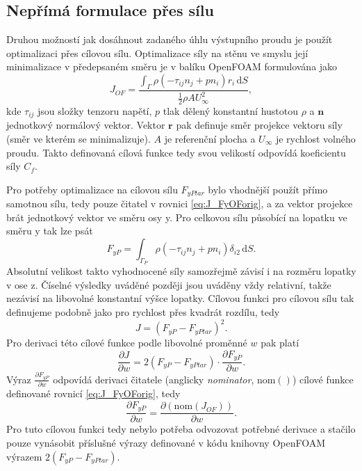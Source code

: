 \subsection{Nepřímá formulace přes sílu}

Druhou možností jak dosáhnout zadaného úhlu výstupního proudu je použít optimalizaci přes cílovou sílu. 
Optimalizace síly na stěnu ve smyslu její minimalizace v předepsaném směru je v balíku OpenFOAM formulována jako
\begin{equation}\label{eq:J_FyOForig}
J_{OF}=\dfrac{\int_\Gamma \rho (-\tau_{ij}n_j+pn_i)r_i\,\mathrm{d}S}{\frac{1}{2}\rho A U_{\infty}^2},
\end{equation}
kde $ \tau_{ij} $ jsou složky tenzoru napětí, $ p $ tlak dělený konstantní hustotou $ \rho $ a $ \mathbf{n} $ jednotkový normálový vektor. Vektor $ \mathbf{r} $ pak definuje směr projekce vektoru síly (směr ve kterém se minimalizuje). $ A $ je referenční plocha a $ U_{\infty} $ je rychlost volného proudu. Takto definovaná cílová funkce tedy svou velikostí odpovídá koeficientu síly $ C_f $.

Pro potřeby optimalizace na cílovou sílu $ F_{yPtar} $ bylo vhodnější použít přímo samotnou sílu, tedy pouze čitatel v rovnici \ref{eq:J_FyOForig}, a za vektor projekce brát jednotkový vektor ve směru osy y. Pro celkovou sílu působící na lopatku ve směru y tak lze psát
\begin{equation}\label{key}
F_{yP}=\int_{\Gamma_P} \rho (-\tau_{ij}n_j+pn_i)\delta_{i2}\,\mathrm{d}S.
\end{equation}
Absolutní velikost takto vyhodnocené síly samozřejmě závisí i na rozměru lopatky v ose z. Číselné výsledky uváděné později jsou uváděny vždy relativní, takže nezávisí na libovolné konstantní výšce lopatky. Cílovou funkci pro cílovou sílu tak definujeme podobně jako pro rychlost přes kvadrát rozdílu, tedy
\begin{equation}\label{eq:J_FyTarget}
J= (F_{yP} - F_{yPtar})^2.
\end{equation}
Pro derivaci této cílové funkce podle libovolné proměnné $ w $ pak platí
\begin{equation}\label{key}
\dfrac{\partial J}{\partial w} = 
2(F_{yP}-F_{yPtar}) \cdot \dfrac{\partial F_{yP}}{\partial w}.
\end{equation}
Výraz $ \frac{\partial F_{yP}}{\partial w} $ odpovídá derivaci čitatele (anglicky \textit{nominator}, $ \mathrm{nom()} $) cílové funkce definované rovnicí \ref{eq:J_FyOForig}, tedy
\begin{equation}\label{key}
\dfrac{\partial F_{yP}}{\partial w} = \dfrac{\partial (\mathrm{nom}(J_{OF}))}{\partial w}.
\end{equation}
Pro tuto cílovou funkci tedy nebylo potřeba odvozovat potřebné derivace a stačilo pouze vynásobit příslušné výrazy definované v kódu knihovny OpenFOAM výrazem $ 2(F_{yP}-F_{yPtar}) $.



